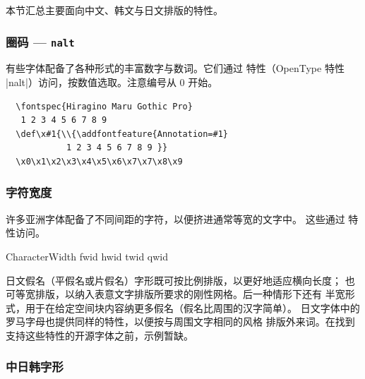 \documentclass[a4paper]{l3doc}
\begin{document}
本节汇总主要面向中文、韩文与日文排版的特性。


\subsubsection{圈码 --- \texttt{nalt} }

有些字体配备了各种形式的丰富数字与数词。它们通过 
特性（OpenType 特性 |nalt|）访问，按数值选取。注意编号从 0 开始。
\begin{Verbatim}
  \fontspec{Hiragino Maru Gothic Pro}
   1 2 3 4 5 6 7 8 9
  \def\x#1{\\{\addfontfeature{Annotation=#1}
            1 2 3 4 5 6 7 8 9 }}
  \x0\x1\x2\x3\x4\x5\x6\x7\x7\x8\x9
\end{Verbatim}


\subsubsection{字符宽度}\label{sec:CharacterWidth}

许多亚洲字体配备了不同间距的字符，以便挤进通常等宽的文字中。
这些通过  特性访问。

\begin{features}{CharacterWidth}
        {fwid}
        {hwid}
       {twid}
     {qwid}
\end{features}

日文假名（平假名或片假名）字形既可按比例排版，以更好地适应横向长度；
也可等宽排版，以纳入表意文字排版所要求的刚性网格。后一种情形下还有
半宽形式，用于在给定空间块内容纳更多假名（假名比周围的汉字简单）。
日文字体中的罗马字母也提供同样的特性，以便按与周围文字相同的风格
排版外来词。在找到支持这些特性的开源字体之前，示例暂缺。




\subsubsection{中日韩字形}
\end{document}
